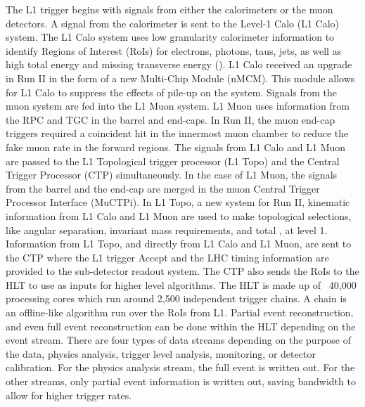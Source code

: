 \indent The L1 trigger begins with signals from either the calorimeters or the muon detectors. A signal from the calorimeter is sent to the Level-1 Calo (L1 Calo) system. The L1 Calo system uses low granularity calorimeter information to identify Regions of Interest (RoIs) for electrons, photons, taus, jets, as well as high total energy and missing transverse energy (\met). L1 Calo received an upgrade in Run II in the form of a new Multi-Chip Module (nMCM). This module allows for L1 Calo to suppress the effects of pile-up on the system. \newline
\indent Signals from the muon system are fed into the L1 Muon system. L1 Muon uses information from the RPC and TGC in the barrel and end-caps. In Run II, the muon end-cap triggers required a coincident hit in the innermost muon chamber to reduce the fake muon rate in the forward regions.\newline
\indent The signals from L1 Calo and L1 Muon are passed to the L1 Topological trigger processor (L1 Topo) and the Central Trigger Processor (CTP) simultaneously. In the case of L1 Muon, the signals from the barrel and the end-cap are merged in the muon Central Trigger Processor Interface  (MuCTPi). In L1 Topo, a new system for Run II, kinematic information from L1 Calo and L1 Muon are used to make topological selections, like angular separation, invariant mass requirements, and total \met , at level 1.\newline
\indent Information from L1 Topo, and directly from L1 Calo and L1 Muon, are sent to the CTP where the L1 trigger Accept and the LHC timing information are provided to the sub-detector readout system. The CTP also sends the RoIs to the HLT to use as inputs for higher level algorithms.\newline
\indent The HLT is made up of ~40,000 processing cores which run around 2,500 independent trigger chains. A chain is an offline-like algorithm run over the RoIs from L1. Partial event reconstruction, and even full event reconstruction can be done within the HLT depending on the event stream. There are four types of data streams depending on the purpose of the data, physics analysis, trigger level analysis, monitoring, or detector calibration. For the physics analysis stream, the full event is written out. For the other streams, only partial event information is written out, saving bandwidth to allow for higher trigger rates.\newline
